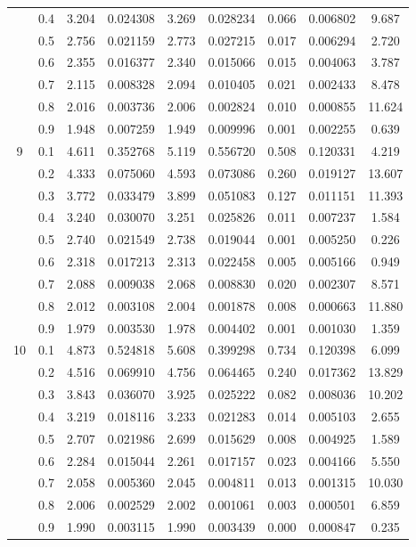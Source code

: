 \begin{longtable}{ | c | c || c | c | c | c | c | c | c | }
 & 0.4 & 3.204 & 0.024308 & 3.269 & 0.028234 & 0.066 & 0.006802 & 9.687 \\
 & 0.5 & 2.756 & 0.021159 & 2.773 & 0.027215 & 0.017 & 0.006294 & 2.720 \\
 & 0.6 & 2.355 & 0.016377 & 2.340 & 0.015066 & 0.015 & 0.004063 & 3.787 \\
 & 0.7 & 2.115 & 0.008328 & 2.094 & 0.010405 & 0.021 & 0.002433 & 8.478 \\
 & 0.8 & 2.016 & 0.003736 & 2.006 & 0.002824 & 0.010 & 0.000855 & 11.624 \\
 & 0.9 & 1.948 & 0.007259 & 1.949 & 0.009996 & 0.001 & 0.002255 & 0.639 \\
 \hline
\multirow{9}{*}{9} & 0.1 & 4.611 & 0.352768 & 5.119 & 0.556720 & 0.508 & 0.120331 & 4.219 \\
 & 0.2 & 4.333 & 0.075060 & 4.593 & 0.073086 & 0.260 & 0.019127 & 13.607 \\
 & 0.3 & 3.772 & 0.033479 & 3.899 & 0.051083 & 0.127 & 0.011151 & 11.393 \\
 & 0.4 & 3.240 & 0.030070 & 3.251 & 0.025826 & 0.011 & 0.007237 & 1.584 \\
 & 0.5 & 2.740 & 0.021549 & 2.738 & 0.019044 & 0.001 & 0.005250 & 0.226 \\
 & 0.6 & 2.318 & 0.017213 & 2.313 & 0.022458 & 0.005 & 0.005166 & 0.949 \\
 & 0.7 & 2.088 & 0.009038 & 2.068 & 0.008830 & 0.020 & 0.002307 & 8.571 \\
 & 0.8 & 2.012 & 0.003108 & 2.004 & 0.001878 & 0.008 & 0.000663 & 11.880 \\
 & 0.9 & 1.979 & 0.003530 & 1.978 & 0.004402 & 0.001 & 0.001030 & 1.359 \\
 \hline
\multirow{9}{*}{10} & 0.1 & 4.873 & 0.524818 & 5.608 & 0.399298 & 0.734 & 0.120398 & 6.099 \\
 & 0.2 & 4.516 & 0.069910 & 4.756 & 0.064465 & 0.240 & 0.017362 & 13.829 \\
 & 0.3 & 3.843 & 0.036070 & 3.925 & 0.025222 & 0.082 & 0.008036 & 10.202 \\
 & 0.4 & 3.219 & 0.018116 & 3.233 & 0.021283 & 0.014 & 0.005103 & 2.655 \\
 & 0.5 & 2.707 & 0.021986 & 2.699 & 0.015629 & 0.008 & 0.004925 & 1.589 \\
 & 0.6 & 2.284 & 0.015044 & 2.261 & 0.017157 & 0.023 & 0.004166 & 5.550 \\
 & 0.7 & 2.058 & 0.005360 & 2.045 & 0.004811 & 0.013 & 0.001315 & 10.030 \\
 & 0.8 & 2.006 & 0.002529 & 2.002 & 0.001061 & 0.003 & 0.000501 & 6.859 \\
 & 0.9 & 1.990 & 0.003115 & 1.990 & 0.003439 & 0.000 & 0.000847 & 0.235 \\
 \hline
\hline
\end{longtable}
 

